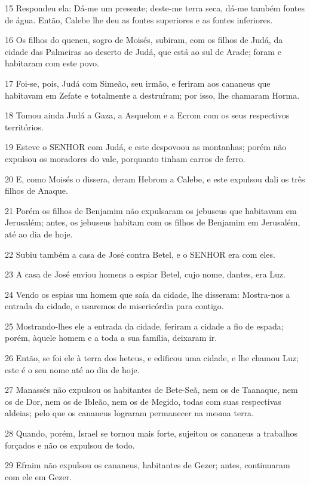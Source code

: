 \par 15 Respondeu ela: Dá-me um presente; deste-me terra seca, dá-me também fontes de água. Então, Calebe lhe deu as fontes superiores e as fontes inferiores.
\par 16 Os filhos do queneu, sogro de Moisés, subiram, com os filhos de Judá, da cidade das Palmeiras ao deserto de Judá, que está ao sul de Arade; foram e habitaram com este povo.
\par 17 Foi-se, pois, Judá com Simeão, seu irmão, e feriram aos cananeus que habitavam em Zefate e totalmente a destruíram; por isso, lhe chamaram Horma.
\par 18 Tomou ainda Judá a Gaza, a Asquelom e a Ecrom com os seus respectivos territórios.
\par 19 Esteve o SENHOR com Judá, e este despovoou as montanhas; porém não expulsou os moradores do vale, porquanto tinham carros de ferro.
\par 20 E, como Moisés o dissera, deram Hebrom a Calebe, e este expulsou dali os três filhos de Anaque.
\par 21 Porém os filhos de Benjamim não expulsaram os jebuseus que habitavam em Jerusalém; antes, os jebuseus habitam com os filhos de Benjamim em Jerusalém, até ao dia de hoje.
\par 22 Subiu também a casa de José contra Betel, e o SENHOR era com eles.
\par 23 A casa de José enviou homens a espiar Betel, cujo nome, dantes, era Luz.
\par 24 Vendo os espias um homem que saía da cidade, lhe disseram: Mostra-nos a entrada da cidade, e usaremos de misericórdia para contigo.
\par 25 Mostrando-lhes ele a entrada da cidade, feriram a cidade a fio de espada; porém, àquele homem e a toda a sua família, deixaram ir.
\par 26 Então, se foi ele à terra dos heteus, e edificou uma cidade, e lhe chamou Luz; este é o seu nome até ao dia de hoje.
\par 27 Manassés não expulsou os habitantes de Bete-Seã, nem os de Taanaque, nem os de Dor, nem os de Ibleão, nem os de Megido, todas com suas respectivas aldeias; pelo que os cananeus lograram permanecer na mesma terra.
\par 28 Quando, porém, Israel se tornou mais forte, sujeitou os cananeus a trabalhos forçados e não os expulsou de todo.
\par 29 Efraim não expulsou os cananeus, habitantes de Gezer; antes, continuaram com ele em Gezer.
